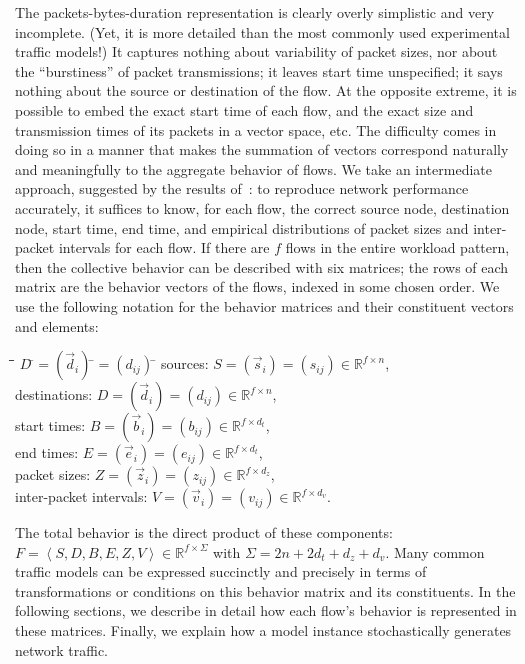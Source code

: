 \documentclass[conference]{IEEEtran}
\newcommand{\R}{\mathbb{R}}
\newcommand{\parensx}[1]{(#1)}
\newcommand{\seq}[1]{\left<#1\right>}
\renewcommand{\bullet}{\raisebox{2pt}{$\centerdot$}}
\begin{document}
The {packets-bytes-duration} representation is clearly overly simplistic and very incomplete. (Yet, it is more detailed than the most commonly used experimental traffic models!) It captures nothing about variability of packet sizes, nor about the ``burstiness'' of packet transmissions; it leaves start time unspecified; it says nothing about the source or destination of the flow. At the opposite extreme, it is possible to embed the exact start time of each flow, and the exact size and transmission times of its packets in a vector space, etc. The difficulty comes in doing so in a manner that makes the summation of vectors correspond naturally and meaningfully to the aggregate behavior of flows. We take an intermediate approach, suggested by the results of~\cite{Karpinski07:realism}: to reproduce network performance accurately, it suffices to know, for each flow, the correct source node, destination node, start time, end time, and empirical distributions of packet sizes and inter-packet intervals for each flow. If there are $f$ flows in the entire workload pattern, then the collective behavior can be described with six matrices; the rows of each matrix are the behavior vectors of the flows, indexed in some chosen order. We use the following notation for the behavior matrices and their constituent vectors and elements:\vspace{-0.25em}
\begin{tabbing}
\hspace{1.5em}\=\bullet\hspace{0.5em}\=\hspace{9.75em}\=
$D\:$\=$=\parensx{\vec{d}_i}\:$\=$=\parensx{d_{ij}}\:$\=\kill
\>\bullet\> sources: \>$S$\>$=\parensx{\vec{s}_i}$\>$=\parensx{s_{ij}}$\>$\in\R^{f \times n}$,\\
\>\bullet\> destinations: \>$D$\>$=\parensx{\vec{d}_i}$\>$=\parensx{d_{ij}}$\>$\in\R^{f \times n}$,\\
\>\bullet\> start times: \>$B$\>$=\parensx{\vec{b}_i}$\>$=\parensx{b_{ij}}$\>$\in\R^{f \times d_t}$,\\
\>\bullet\> end times: \>$E$\>$=\parensx{\vec{e}_i}$\>$=\parensx{e_{ij}}$\>$\in\R^{f \times d_t}$,\\
\>\bullet\> packet sizes: \>$Z$\>$=\parensx{\vec{z}_i}$\>$=\parensx{z_{ij}}$\>$\in\R^{f \times d_z}$,\\
\>\bullet\> inter-packet intervals: \>$V$\>$=\parensx{\vec{v}_i}$\>$=\parensx{v_{ij}}$\>$\in\R^{f \times d_v}$.
\end{tabbing}
The total behavior is the direct product of these components: $F = \seq{S,D,B,E,Z,V} \in \R^{f \times \Sigma}$ with $\Sigma=2n+2d_t+d_z+d_v$. Many common traffic models can be expressed succinctly and precisely in terms of transformations or conditions on this behavior matrix and its constituents. In the following sections, we describe in detail how each flow's behavior is represented in these matrices. Finally, we explain how a model instance stochastically generates network traffic.
\end{document}
